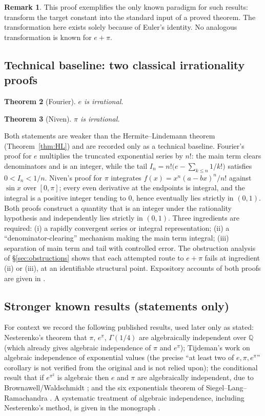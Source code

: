 \documentclass[11pt]{amsart}
\newtheorem{theorem}{Theorem}[section]
\theoremstyle{definition}
\newtheorem{remark}[theorem]{Remark}
\theoremstyle{remark}
\numberwithin{equation}{section}
\newcommand{\Q}{\mathbb{Q}}
\newcommand{\ee}{e}
\begin{document}
\begin{remark}
This proof exemplifies the only known paradigm for such results: transform the target constant into the standard input of a proved theorem. The transformation here exists solely because of Euler's identity. No analogous transformation is known for $e+\pi$.
\end{remark}

\subsection{Technical baseline: two classical irrationality proofs}

\begin{theorem}[Fourier]\label{thm:fourier}
$\ee$ is irrational.
\end{theorem}

\begin{theorem}[Niven]\label{thm:niven}
$\pi$ is irrational.
\end{theorem}

Both statements are weaker than the Hermite--Lindemann theorem
(Theorem~\ref{thm:HL}) and are recorded only as a technical
baseline. Fourier's proof for $\ee$ multiplies the truncated
exponential series by $n!$: the main term clears denominators and
is an integer, while the tail
$I_n=n!\bigl(\ee-\sum_{k\le n}1/k!\bigr)$ satisfies $0<I_n<1/n$.
Niven's proof for $\pi$ integrates $f(x)=x^n(a-bx)^n/n!$ against
$\sin x$ over $[0,\pi]$; every even derivative at the endpoints is
integral, and the integral is a positive integer tending to $0$,
hence eventually lies strictly in $(0,1)$. Both proofs construct a
quantity that is an integer under the rationality hypothesis and
independently lies strictly in $(0,1)$. Three ingredients are
required: (i) a rapidly convergent series or integral
representation; (ii) a ``denominator-clearing'' mechanism making
the main term integral; (iii) separation of main term and tail
with controlled error. The obstruction analysis of
\S\ref{sec:obstructions} shows that each attempted route to
$e+\pi$ fails at ingredient (ii) or (iii), at an identifiable
structural point. Expository accounts of both proofs are given in
\cite{Conrad}.
\subsection{Stronger known results (statements only)}\label{sub:stronger-known}

For context we record the following published results, used later only as stated: Nesterenko's theorem that $\pi$, $\ee^\pi$, $\Gamma(1/4)$ are algebraically independent over $\Q$ \cite{Nesterenko1996} (which already gives algebraic independence of $\pi$ and $\ee^\pi$); Tijdeman's work on algebraic independence of exponential values \cite{Tijdemann1971} (the precise ``at least two of $\ee,\pi,\ee^\pi$'' corollary is not verified from the original and is not relied upon); the conditional result that if $\ee^{\pi^2}$ is algebraic then $\ee$ and $\pi$ are algebraically independent, due to Brownawell/Waldschmidt \cite{Brownawell1974}; and the six exponentials theorem of Siegel--Lang--Ramachandra \cite{Lang1966,Ramachandra1968}. A systematic treatment of algebraic independence, including Nesterenko's method, is given in the monograph \cite{Zhu2024}.
\end{document}
